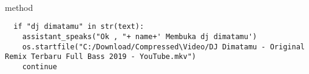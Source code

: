 \\
\\
\\
\\
\\
\\
\\
\\
\\
\\
\\
\\
\\
\\
\\
\\
\\
\\
\\
\\
\\
\\
\\
\\
\\
\\
\\
\\
\\
\\
\\
\\
\\
 method 
\begin{lstlisting}
  if "dj dimatamu" in str(text):
    assistant_speaks("Ok , "+ name+' Membuka dj dimatamu')
    os.startfile("C:/Download/Compressed\Video/DJ Dimatamu - Original Remix Terbaru Full Bass 2019 - YouTube.mkv")
    continue
\end{lstlisting}
\\
\\
\\
\\
\\
\\
\\
\\
\\
\\
\\
\\
\\
\\
\\
\\
\\
\\
\\
\\
